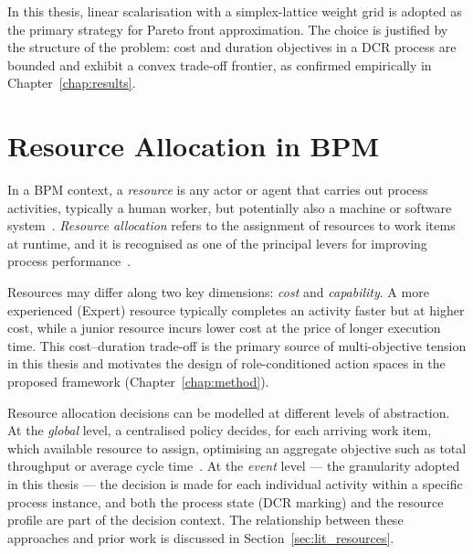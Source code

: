 In this thesis, linear scalarisation with a simplex-lattice weight grid is
adopted as the primary strategy for Pareto front approximation.  The choice is
justified by the structure of the problem: cost and duration objectives in a
DCR process are bounded and exhibit a convex trade-off frontier, as confirmed
empirically in Chapter~\ref{chap:results}.

\section{Resource Allocation in BPM}
\label{sec:resources}

In a BPM context, a \emph{resource} is any actor or agent that carries out
process activities, typically a human worker, but potentially also a machine
or software system~\cite{Huang2011ReinforcementManagement}.  \emph{Resource
allocation} refers to the assignment of resources to work items at runtime, and
it is recognised as one of the principal levers for improving process
performance~\cite{Huang2011ReinforcementManagement}.

Resources may differ along two key dimensions: \emph{cost} and
\emph{capability}.  A more experienced (Expert) resource typically completes
an activity faster but at higher cost, while a junior resource incurs lower
cost at the price of longer execution time.  This cost--duration trade-off is
the primary source of multi-objective tension in this thesis and motivates the
design of role-conditioned action spaces in the proposed framework
(Chapter~\ref{chap:method}).

Resource allocation decisions can be modelled at different levels of
abstraction.  At the \emph{global} level, a centralised policy decides, for
each arriving work item, which available resource to assign, optimising an
aggregate objective such as total throughput or average cycle
time~\cite{Huang2011ReinforcementManagement}.  At the \emph{event} level ---
the granularity adopted in this thesis --- the decision is made for each
individual activity within a specific process instance, and both the process
state (DCR marking) and the resource profile are part of the decision context.
The relationship between these approaches and prior work is discussed in
Section~\ref{sec:lit_resources}.
